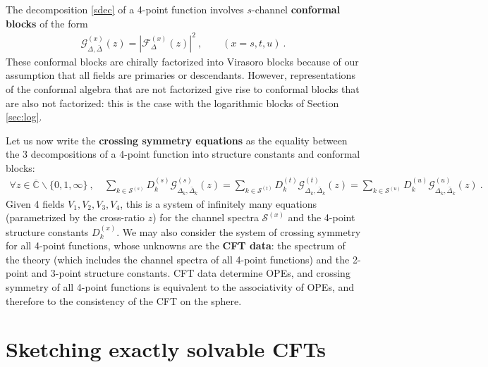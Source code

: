 \documentclass[12pt, a4paper]{article}
\newcommand{\myindex}[1]{\textbf{\boldmath #1}}
\begin{document}
The decomposition \eqref{sdec} of a 4-point function involves $s$-channel \myindex{conformal blocks} of the form
\begin{align}
 \mathcal{G}^{(x)}_{\Delta,\bar\Delta}(z) = \left|\mathcal{F}_{\Delta}^{(x)}(z)\right|^2\ , \qquad (x=s,t,u)\ . 
 \label{gf2}
\end{align}
These conformal blocks are chirally factorized into Virasoro blocks because of our assumption that all fields are primaries or descendants. However, representations of the conformal algebra that are not factorized give rise to conformal blocks that are also not factorized: this is the case with the logarithmic blocks of Section \ref{sec:log}.

Let us now write the \myindex{crossing symmetry equations} as the equality between the 3 decompositions of a 4-point function into structure constants and conformal blocks:
\begin{align}
 \boxed{\forall z\in \overline{\mathbb{C}}\backslash\{0,1,\infty\} \ , \quad 
 \sum_{k\in\mathcal{S}^{(s)}} D_k^{(s)} \mathcal{G}^{(s)}_{\Delta_k,\bar\Delta_k}(z) 
 = \sum_{k\in\mathcal{S}^{(t)}} D_k^{(t)} \mathcal{G}^{(t)}_{\Delta_k,\bar\Delta_k}(z) 
 = \sum_{k\in\mathcal{S}^{(u)}} D_k^{(u)} \mathcal{G}^{(u)}_{\Delta_k,\bar\Delta_k}(z)} \ . 
 \label{seteu}
\end{align}
Given 4 fields $V_1,V_2,V_3,V_4$, this is a system of infinitely many equations (parametrized by the cross-ratio $z$) for the channel spectra $\mathcal{S}^{(x)}$ and the 4-point structure constants $D_k^{(x)}$.
We may also consider the system of crossing symmetry for all 4-point functions, whose unknowns are the \myindex{CFT data}: the spectrum of the theory (which includes the channel spectra of all 4-point functions) and the 2-point and 3-point structure constants. CFT data determine OPEs, and crossing symmetry of all 4-point functions is equivalent to the associativity of OPEs, and therefore to the consistency of the CFT on the sphere.


\section{Sketching exactly solvable CFTs}\label{sec:sesc}
\end{document}
